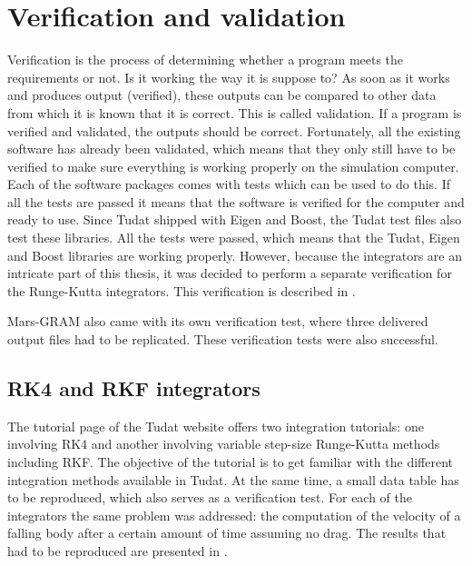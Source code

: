 \chapter{Verification and validation} 
\label{ch:verificationandvalidation}
Verification is the process of determining whether a program meets the requirements or not. Is it working the way it is suppose to? As soon as it works and produces output (verified), these outputs can be compared to other data from which it is known that it is correct. This is called validation. If a program is verified and validated, the outputs should be correct. Fortunately, all the existing software has already been validated, which means that they only still have to be verified to make sure everything is working properly on the simulation computer. Each of the software packages comes with tests which can be used to do this. If all the tests are passed it means that the software is verified for the computer and ready to use. Since \ac{Tudat} shipped with Eigen and Boost, the \ac{Tudat} test files also test these libraries. All the tests were passed, which means that the \ac{Tudat}, Eigen and Boost libraries are working properly. However, because the integrators are an intricate part of this thesis, it was decided to perform a separate verification for the Runge-Kutta integrators. This verification is described in .

 Mars-\ac{GRAM} also came with its own verification test, where three delivered output files had to be replicated. These verification tests were also successful. 


\section{\acs{RK4} and \acs{RKF} integrators}
\label{sec:rkandrkfver}
The tutorial page of the \ac{Tudat} website \citep{dirkx2016tudat} offers two integration tutorials: one involving \ac{RK4} and another involving variable step-size Runge-Kutta methods including \ac{RKF}. The objective of the tutorial is to get familiar with the different integration methods available in \ac{Tudat}. At the same time, a small data table has to be reproduced, which also serves as a verification test. For each of the integrators the same problem was addressed: the computation of the velocity of a falling body after a certain amount of time assuming no drag. The results that had to be reproduced are presented in .


